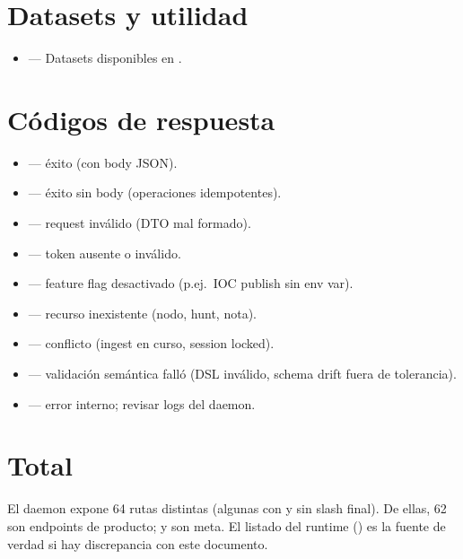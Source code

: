 \section{Datasets y utilidad}

\begin{itemize}
    \item {} — Datasets disponibles en
    .
\end{itemize}

\section{Códigos de respuesta}

\begin{itemize}
    \item {} — éxito (con body JSON).
    \item {} — éxito sin body (operaciones idempotentes).
    \item {} — request inválido (DTO mal formado).
    \item {} — token ausente o inválido.
    \item {} — feature flag desactivado (p.ej.\ IOC publish
    sin env var).
    \item {} — recurso inexistente (nodo, hunt, nota).
    \item {} — conflicto (ingest en curso, session locked).
    \item {} — validación semántica falló (DSL inválido,
    schema drift fuera de tolerancia).
    \item {} — error interno; revisar logs del daemon.
\end{itemize}

\section{Total}

El daemon expone 64 rutas distintas (algunas con y sin slash
final). De ellas, 62 son endpoints de producto; \code{/} y
 son meta. El listado  del runtime
() es la fuente de verdad si hay discrepancia
con este documento.
